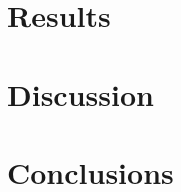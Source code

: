 \documentclass{article}
\begin{document}
\begin{multicols}{2}
\section{Results}
\section{Discussion}
\section{Conclusions}


\end{multicols}
\end{document}
